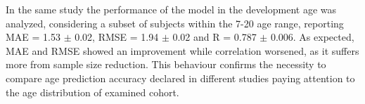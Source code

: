 \documentclass{article}
\begin{document}
	
	In the same study the performance of the model in the development age was analyzed, considering a subset of subjects within the 7-20 age range, reporting MAE = 1.53 $\pm$ 0.02, RMSE = 1.94 $\pm$ 0.02 and R = 0.787 $\pm$ 0.006. As expected, MAE and RMSE showed an improvement while correlation worsened, as it suffers more from sample size reduction. This behaviour confirms the necessity to compare age prediction accuracy declared in different studies paying attention to the age distribution of examined cohort.
\end{document}
